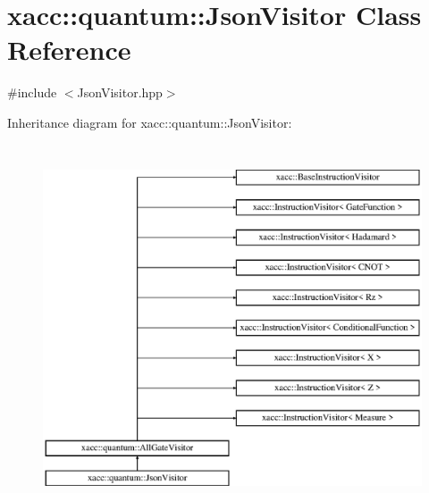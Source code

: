 \hypertarget{a01340}{}\section{xacc\+:\+:quantum\+:\+:Json\+Visitor Class Reference}
\label{a01340}


{\ttfamily \#include $<$Json\+Visitor.\+hpp$>$}

Inheritance diagram for xacc\+:\+:quantum\+:\+:Json\+Visitor\+:\begin{figure}[H]
\begin{center}
\leavevmode
\includegraphics[height=10.883392cm]{a01340}
\end{center}
\end{figure}

